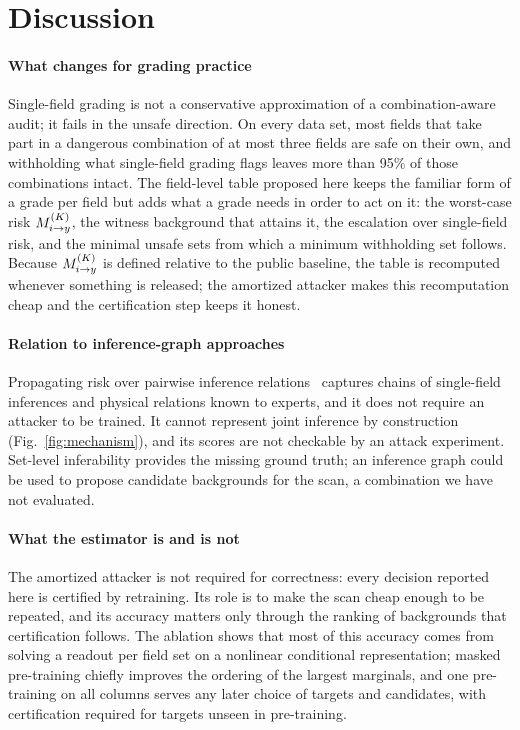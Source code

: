 \section{Discussion}\label{sec:discussion}

\paragraph{What changes for grading practice}
Single-field grading is not a conservative approximation of a combination-aware audit; it fails
in the unsafe direction. On every data set, most fields that take part in a dangerous combination of
at most three fields are safe on their own, and withholding what single-field grading flags leaves
more than 95\% of those combinations intact. The field-level table proposed here keeps the
familiar form of a grade per field but adds what a grade needs in order to act on it: the
worst-case risk $M^{(K)}_{i \to y}$, the witness background that attains it, the escalation over single-field
risk, and the minimal unsafe sets from which a minimum withholding set follows. Because $M^{(K)}_{i \to y}$ is
defined relative to the public baseline, the table is recomputed whenever something is released;
the amortized attacker makes this recomputation cheap and the certification step keeps it honest.

\paragraph{Relation to inference-graph approaches}
Propagating risk over pairwise inference relations~\cite{hu2026ignn} captures chains of
single-field inferences and physical relations known to experts, and it does not require an
attacker to be trained. It cannot represent joint inference by construction (Fig.~\ref{fig:mechanism}),
and its scores are not checkable by an attack experiment. Set-level inferability provides the
missing ground truth; an inference graph could be used to propose candidate backgrounds for the
scan, a combination we have not evaluated.

\paragraph{What the estimator is and is not}
The amortized attacker is not required for correctness: every decision reported here is certified
by retraining. Its role is to make the scan cheap enough to be repeated, and its accuracy matters
only through the ranking of backgrounds that certification follows. The ablation shows that most
of this accuracy comes from solving a readout per field set on a nonlinear conditional
representation; masked pre-training chiefly improves the ordering of the largest marginals, and
one pre-training on all columns serves any later choice of targets and candidates, with
certification required for targets unseen in pre-training.

